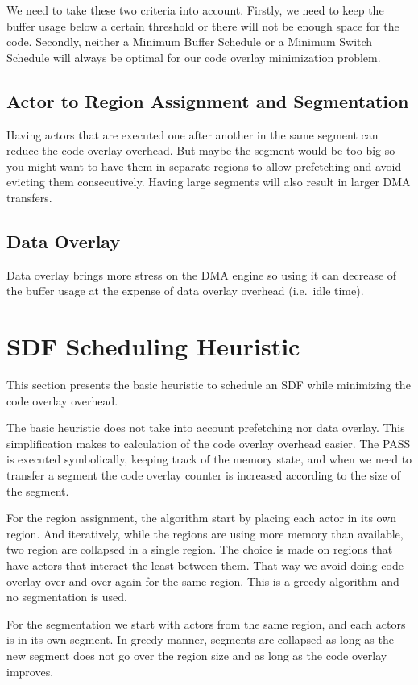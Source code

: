 \documentclass{article}
\begin{document}
We need to take these two criteria into account.
Firstly, we need to keep the buffer usage below a certain threshold or there will not be enough space for the code.
Secondly, neither a Minimum Buffer Schedule or a Minimum Switch Schedule will always be optimal for our code overlay minimization problem.

\subsection{Actor to Region Assignment and Segmentation}
Having actors that are executed one after another in the same segment can reduce the code overlay overhead.
But maybe the segment would be too big so you might want to have them in separate regions to allow prefetching and avoid evicting them consecutively.
Having large segments will also result in larger DMA transfers.

\subsection{Data Overlay}
Data overlay brings more stress on the DMA engine so using it can decrease of the buffer usage at the expense of data overlay overhead (i.e.\ idle time).

\section{SDF Scheduling Heuristic}
\label{heuristic}
This section presents the basic heuristic to schedule an SDF while minimizing the code overlay overhead.

The basic heuristic does not take into account prefetching nor data overlay.
This simplification makes to calculation of the code overlay overhead easier.
The PASS is executed symbolically, keeping track of the memory state, and when we need to transfer a segment the code overlay counter is increased according to the size of the segment.

For the region assignment, the algorithm start by placing each actor in its own region.
And iteratively, while the regions are using more memory than available, two region are collapsed in a single region.
The choice is made on regions that have actors that interact the least between them.
That way we avoid doing code overlay over and over again for the same region.
This is a greedy algorithm and no segmentation is used.

For the segmentation we start with actors from the same region, and each actors is in its own segment.
In greedy manner, segments are collapsed as long as the new segment does not go over the region size and as long as the code overlay improves.
\end{document}
